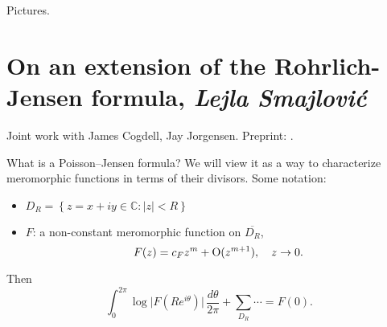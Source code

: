 \documentclass[reqno]{amsart} 
\begin{document}
Pictures.


\section{On an extension of the Rohrlich-Jensen formula, \textnormal{\emph{Lejla Smajlović}}}
Joint work with James Cogdell, Jay Jorgensen.  Preprint: \cite{2021arXiv2101.09599}.

What is a Poisson--Jensen formula?  We will view it as a way to characterize meromorphic functions in terms of their divisors.  Some notation:
\begin{itemize}
\item $D_R = \left\{ z = x + i y \in \mathbb{C} : \lvert z \rvert < R \right\}$
\item $F$: a non-constant meromorphic function on $\overline{D_R}$,
  \begin{equation*}
    F(z) = c_F z^m + \operatorname{O}(z^{m + 1}), \quad z \rightarrow 0.
  \end{equation*}
\end{itemize}
Then
\begin{equation*}
  \int_0^{2 \pi}
  \log \lvert F(R e^{i \theta}) \rvert
  \, \frac{d \theta}{2 \pi}
  + \sum _{D_R} \dotsb = F(0).
\end{equation*}
\end{document}
